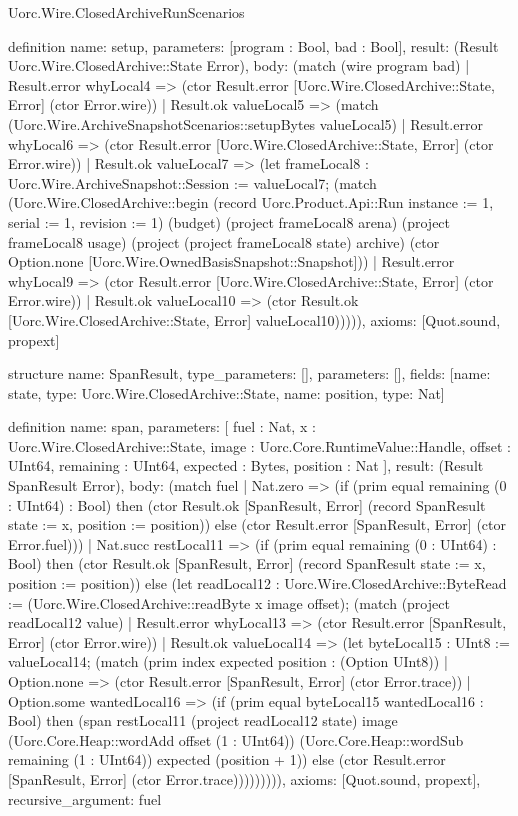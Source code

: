 \begin{lexlean}{Uorc.Wire.ClosedArchiveRunScenarios}
\begin{semanticmodule}
definition{
  name: setup,
  parameters: [program : Bool, bad : Bool],
  result: (Result Uorc.Wire.ClosedArchive::State Error),
  body: (match (wire program bad)
    | Result.error whyLocal4 => (ctor Result.error [Uorc.Wire.ClosedArchive::State, Error] (ctor Error.wire))
    | Result.ok valueLocal5 => (match (Uorc.Wire.ArchiveSnapshotScenarios::setupBytes valueLocal5)
      | Result.error whyLocal6 => (ctor Result.error [Uorc.Wire.ClosedArchive::State, Error] (ctor Error.wire))
      | Result.ok valueLocal7 => (let frameLocal8 : Uorc.Wire.ArchiveSnapshot::Session := valueLocal7; (match (Uorc.Wire.ClosedArchive::begin (record Uorc.Product.Api::Run {instance := 1, serial := 1, revision := 1}) (budget) (project frameLocal8 arena) (project frameLocal8 usage) (project (project frameLocal8 state) archive) (ctor Option.none [Uorc.Wire.OwnedBasisSnapshot::Snapshot]))
        | Result.error whyLocal9 => (ctor Result.error [Uorc.Wire.ClosedArchive::State, Error] (ctor Error.wire))
        | Result.ok valueLocal10 => (ctor Result.ok [Uorc.Wire.ClosedArchive::State, Error] valueLocal10))))),
  axioms: [Quot.sound, propext]
}

structure{
  name: SpanResult,
  type_parameters: [],
  parameters: [],
  fields: [{name: state, type: Uorc.Wire.ClosedArchive::State}, {name: position, type: Nat}]
}

definition{
  name: span,
  parameters: [
    fuel : Nat,
    x : Uorc.Wire.ClosedArchive::State,
    image : Uorc.Core.RuntimeValue::Handle,
    offset : UInt64,
    remaining : UInt64,
    expected : Bytes,
    position : Nat
  ],
  result: (Result SpanResult Error),
  body: (match fuel
    | Nat.zero => (if (prim equal remaining (0 : UInt64) : Bool) then (ctor Result.ok [SpanResult, Error] (record SpanResult {state := x, position := position})) else (ctor Result.error [SpanResult, Error] (ctor Error.fuel)))
    | Nat.succ restLocal11 => (if (prim equal remaining (0 : UInt64) : Bool) then (ctor Result.ok [SpanResult, Error] (record SpanResult {state := x, position := position})) else (let readLocal12 : Uorc.Wire.ClosedArchive::ByteRead := (Uorc.Wire.ClosedArchive::readByte x image offset); (match (project readLocal12 value)
      | Result.error whyLocal13 => (ctor Result.error [SpanResult, Error] (ctor Error.wire))
      | Result.ok valueLocal14 => (let byteLocal15 : UInt8 := valueLocal14; (match (prim index expected position : (Option UInt8))
        | Option.none => (ctor Result.error [SpanResult, Error] (ctor Error.trace))
        | Option.some wantedLocal16 => (if (prim equal byteLocal15 wantedLocal16 : Bool) then (span restLocal11 (project readLocal12 state) image (Uorc.Core.Heap::wordAdd offset (1 : UInt64)) (Uorc.Core.Heap::wordSub remaining (1 : UInt64)) expected (position + 1)) else (ctor Result.error [SpanResult, Error] (ctor Error.trace))))))))),
  axioms: [Quot.sound, propext],
  recursive_argument: fuel
}


\end{semanticmodule}
\end{lexlean}
